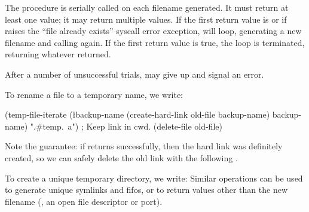 The  procedure is serially called on each filename generated.
It must return at least one value; it may return multiple values. If
the first return value is  or if  raises the ``file already
exists'' syscall error exception,  will loop,
generating a new filename and calling  again.
If the first return value is true, the loop is terminated, 
returning whatever  returned.

After a number of unsuccessful trials,  may give up
and signal an error.

To rename a file to a temporary name, we write:
\begin{code}
(temp-file-iterate (\l{backup-name}
                     (create-hard-link old-file
                                       backup-name)
                     backup-name)
                   ".#temp.~a") ; Keep link in cwd.
(delete-file old-file)\end{code}
Note the guarantee: if  returns successfully,
then the hard link was definitely created, so we can safely delete the
old link with the following .

To create a unique temporary directory, we write:
%
%
Similar operations can be used to generate unique symlinks and fifos,
or to return values other than the new filename (\eg, an open file
descriptor or port).


